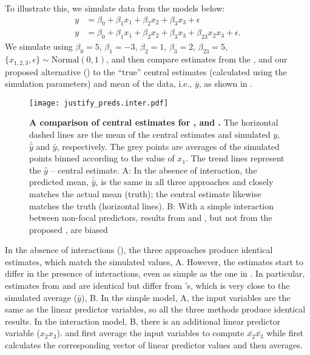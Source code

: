 To illustrate this, we simulate data from the models below:
%
\begin{align}
y &= \beta_0 + \beta_1x_1 + \beta_2x_2 + \beta_3x_3 + \epsilon \label{eq:simple_inter_higher_no_interaction}\\
y &= \beta_0 + \beta_1x_1 + \beta_2x_2 + \beta_3x_3 + \beta_{23}x_2x_3 + \epsilon \label{eq:simple_inter_higher}.
\end{align}
%
We simulate using $\beta_0 = 5$, $\beta_1 = -3$, $\beta_2 = 1$, $\beta_3 = 2$, $\beta_{23} = 5$, $\{x_{1,2,3}, \epsilon\} \sim \mathrm{Normal}(0, 1)$, and then compare estimates from the ,  and our proposed alternative () to the ``true'' central estimates (calculated using the simulation parameters) and mean of the data, i.e., $\bar{y}$, as shown in .
%
\begin{figure}
\begin{center}
\texttt{[image: justify\_preds.inter.pdf]}
\end{center}
\caption{{\bf A comparison of central estimates for ,  and .} The horizontal dashed lines are the mean of the central estimates and simulated $y$, $\bar{\hat{y}}$ and $\bar{y}$, respectively. The grey points are averages of the simulated points binned according to the value of $x_1$. The trend lines represent the $\hat{y}$ -- central estimate. A: In the absence of interaction, the predicted mean, $\bar{\hat{y}}$, is the same in all three approaches and closely matches the actual mean (truth); the central estimate likewise matches the truth (horizontal lines). B: With a simple interaction between non-focal predictors, results from  and , but not from the proposed , are biased}
\label{fig:justify_plots}
\end{figure}
%
In the absence of interactions (), the three approaches produce identical estimates, which match the simulated values, A. However, the estimates start to differ in the presence of interactions, even as simple as the one in . In particular, estimates from  and  are identical but differ from 's, which is very close to the simulated average ($\bar{y}$), B.
In the simple model, A, the input variables are the same as the linear predictor variables, so all the three methods produce identical results.
In the interaction model, B, there is an additional linear predictor variable ($x_2x_3$).  and  first average the input variables to compute $\bar{x_2}\bar{x_3}$ while  first calculates the corresponding vector of linear predictor values and then averages.

